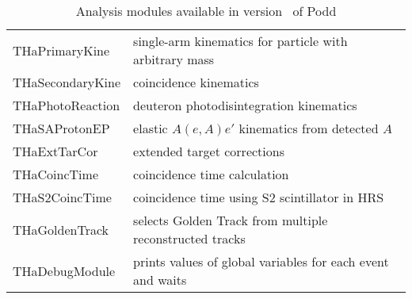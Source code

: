 {\begin{table}[p]
\begin{tabular}{|l|l|}
THaPrimaryKine   & single-arm kinematics for particle with arbitrary mass \\
THaSecondaryKine & coincidence kinematics \\
THaPhotoReaction & deuteron photodisintegration kinematics \\
THaSAProtonEP    & elastic $A(e,A)e'$ kinematics from detected $A$ \\
THaExtTarCor     & extended target corrections \\
THaCoincTime     & coincidence time calculation \\
THaS2CoincTime   & coincidence time using S2 scintillator in HRS \\
THaGoldenTrack   & selects Golden Track from multiple reconstructed tracks \\
THaDebugModule   & prints values of global variables for each event and waits\\
\hline
\end{tabular}
\caption{Analysis modules available in version \cppaver\ of Podd}
\label{offl:tab:modules}
\end{table}


} %


